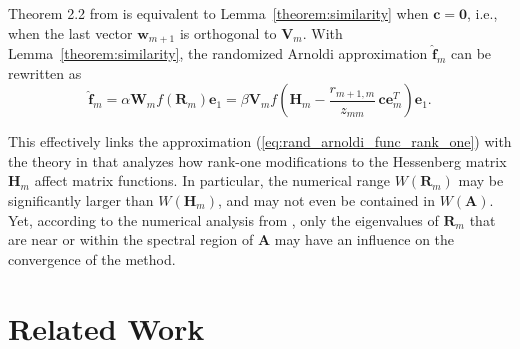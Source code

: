 \documentclass[smallextended]{svjour3}
\renewcommand{\vec}[1]{\mathbf{#1}}
\newcommand{\mat}[1]{\mathbf{#1}}
\begin{document}
Theorem 2.2 from \cite{grigori_restoring_2026} is equivalent to Lemma~\ref{theorem:similarity} when $\vec{c} = \vec{0}$, i.e., when the last vector $\vec{w}_{m+1}$ is orthogonal to $\mat{V}_m$. With Lemma~\ref{theorem:similarity}, the randomized Arnoldi approximation $\vec{\hat{f}}_m$ can be rewritten as
\begin{equation}
\label{eq:rand_arnoldi_func_rank_one}
\vec{\hat{f}}_m = \alpha \mat{W}_m f(\mat{R}_m) \vec{e}_1 = \beta \mat{V}_m f \left(\mat{H}_m - \frac{r_{m+1, m}}{z_{mm}} \, \vec{c} \vec{e}_m^T \right) \vec{e}_1.
\end{equation}

This effectively links the approximation (\ref{eq:rand_arnoldi_func_rank_one}) with the theory in \cite{palitta_sketched_2025} that analyzes how rank-one modifications to the Hessenberg matrix $\mat{H}_m$ affect matrix functions. In particular, the numerical range $W(\mat{R}_m)$ may be significantly larger than $W(\mat{H}_m)$, and may not even be contained in $W(\mat{A})$. Yet, according to the numerical analysis from \cite{palitta_sketched_2025}, only the eigenvalues of $\mat{R}_m$ that are near or within the spectral region of $\mat{A}$ may have an influence on the convergence of the method.

\section{Related Work}
\label{sec:related_works}
\end{document}

